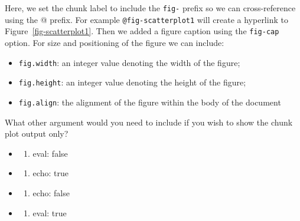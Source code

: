 \documentclass[
  letterpaper,
  DIV=11,
  numbers=noendperiod]{scrartcl}
\providecommand{\tightlist}{%
  \setlength{\itemsep}{0pt}\setlength{\parskip}{0pt}}\usepackage{longtable,booktabs,array}
\begin{document}
Here, we set the chunk label to include the \texttt{fig-} prefix so we
can cross-reference using the @ prefix. For example
\texttt{@fig-scatterplot1} will create a hyperlink to
Figure~\ref{fig-scatterplot1}. Then we added a figure caption using the
\texttt{fig-cap} option. For size and positioning of the figure we can
include:

\begin{itemize}
\tightlist
\item
  \texttt{fig.width}: an integer value denoting the width of the figure;
\item
  \texttt{fig.height}: an integer value denoting the height of the
  figure;
\item
  \texttt{fig.align}: the alignment of the figure within the body of the
  document
\end{itemize}

\begin{tcolorbox}[enhanced jigsaw, colback=white, toprule=.15mm, arc=.35mm, colbacktitle=quarto-callout-tip-color!10!white, titlerule=0mm, colframe=quarto-callout-tip-color-frame, title={Question}, bottomtitle=1mm, toptitle=1mm, coltitle=black, rightrule=.15mm, opacityback=0, bottomrule=.15mm, breakable, leftrule=.75mm, left=2mm, opacitybacktitle=0.6]

What other argument would you need to include if you wish to show the
chunk plot output only?

\begin{itemize}
\item
  \begin{enumerate}
  \def\labelenumi{(\Alph{enumi})}
  \tightlist
  \item
    eval: false\\
  \end{enumerate}
\item
  \begin{enumerate}
  \def\labelenumi{(\Alph{enumi})}
  \setcounter{enumi}{1}
  \tightlist
  \item
    echo: true\\
  \end{enumerate}
\item
  \begin{enumerate}
  \def\labelenumi{(\Alph{enumi})}
  \setcounter{enumi}{2}
  \tightlist
  \item
    echo: false\\
  \end{enumerate}
\item
  \begin{enumerate}
  \def\labelenumi{(\Alph{enumi})}
  \setcounter{enumi}{3}
  \tightlist
  \item
    eval: true
  \end{enumerate}
\end{itemize}

\end{tcolorbox}
\end{document}
